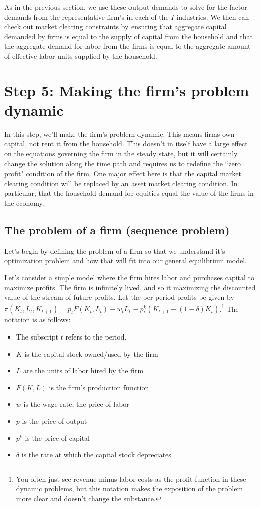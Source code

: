 \documentclass[letterpaper,12pt]{article}
\theoremstyle{definition}
\begin{document}
\begin{spacing}{1.5}
As in the previous section, we use these output demands to solve for the factor demands from the representative firm's in each of the $I$ industries.  We then can check out market clearing constraints by ensuring that aggregate capital demanded by firms is equal to the supply of capital from the household and that the aggregate demand for labor from the firms is equal to the aggregate amount of effective labor units supplied by the household.

\section*{Step 5: Making the firm's problem dynamic}

In this step, we'll make the firm's problem dynamic. This means firms own capital, not rent it from the household.  This doesn't in itself have a large effect on the equations governing the firm in the steady state, but it will certainly change the solution along the time path and requires us to redefine the ``zero profit" condition of the firm. One major effect here is that the capital market clearing condition will be replaced by an asset market clearing condition.  In particular, that the household demand for equities equal the value of the firms in the economy.

\subsection*{The problem of a firm (sequence problem)}

Let's begin by defining the problem of a firm so that we understand it's optimization problem and how that will fit into our general equilibrium model.

Let's consider a simple model where the firm hires labor and purchases capital to maximize profits.  The firm is infinitely lived, and so it maximizing the discounted value of the stream of future profits.  Let the per period profits be given by $\pi(K_{t},L_{t},K_{t+1}) = p_{t}F(K_{t},L_{t}) - w_{t}L_{t} - p^{k}_{t}(K_{t+1} - (1-\delta)K_{t})$.\footnote{You often just see revenue minus labor costs as the profit function in these dynamic problems, but this notation makes the exposition of the problem more clear and doesn't change the substance.}  The notation is as follows:
\begin{itemize}
\item The subscript $t$ refers to the period. 
\item $K$ is the capital stock owned/used by the firm
\item $L$ are the units of labor hired by the firm
\item $F(K,L)$ is the firm's production function
\item $w$ is the wage rate, the price of labor
\item $p$ is the price of output
\item $p^{k}$ is the price of capital
\item $\delta$ is the rate at which the capital stock depreciates
\end{itemize}


\end{spacing}
\end{document}
